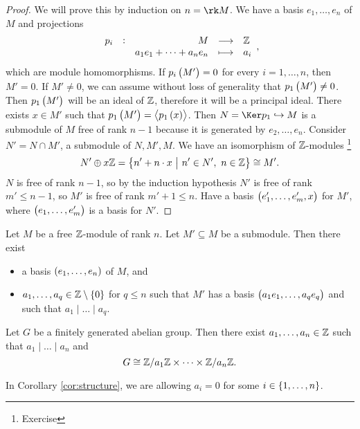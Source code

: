 \begin{proof}
We will prove this by induction on $ n = \rk M $. We have a basis $ e_1, \dots, e_n $ of $ M $ and projections
$$ \function[p_i]{M}{\ZZ}{a_1e_1 + \dots + a_ne_n}{a_i}, $$
which are module homomorphisms. If $ p_i\br{M'} = 0 $ for every $ i = 1, \dots, n $, then $ M' = 0 $. If $ M' \ne 0 $, we can assume without loss of generality that $ p_1\br{M'} \ne 0 $. Then $ p_1\br{M'} $ will be an ideal of $ \mathbb{Z} $, therefore it will be a principal ideal. There exists $ x \in M' $ such that $ p_1\br{M'} = \abr{p_1\br{x}} $. Then $ N = \Ker p_1 \hookrightarrow M $ is a submodule of $ M $ free of rank $ n - 1 $ because it is generated by $ e_2, \dots, e_n $. Consider $ N' = N \cap M' $, a submodule of $ N, M', M $. We have an isomorphism of $ \mathbb{Z} $-modules \footnote{Exercise}
$$ N' \oplus x\ZZ = \cbr{n' + n \cdot x \st n' \in N', \ n \in \ZZ} \cong M'. $$
$ N $ is free of rank $ n - 1 $, so by the induction hypothesis $ N' $ is free of rank $ m' \le n - 1 $, so $ M' $ is free of rank $ m' + 1 \le n $. Have a basis $ \br{e_1', \dots, e_m', x} $ for $ M' $, where $ \br{e_1, \dots, e_m'} $ is a basis for $ N' $.
\end{proof}

\begin{theorem}
\label{thm:structure}
Let $ M $ be a free $ \mathbb{Z} $-module of rank $ n $. Let $ M' \subseteq M $ be a submodule. Then there exist
\begin{itemize}
\item a basis $ \br{e_1, \dots, e_n} $ of $ M $, and
\item $ a_1, \dots, a_q \in \ZZ \setminus \cbr{0} $ for $ q \le n $ such that $ M' $ has a basis $ \br{a_1e_1, \dots, a_qe_q} $ and such that $ a_1 \mid \dots \mid a_q $.
\end{itemize}
\end{theorem}

\begin{corollary}
\label{cor:structure}
Let $ G $ be a finitely generated abelian group. Then there exist $ a_1, \dots, a_n \in \mathbb{Z} $ such that $ a_1 \mid \dots \mid a_n $ and
$$ G \cong \mathbb{Z} / a_1\mathbb{Z} \times \dots \times \mathbb{Z} / a_n\mathbb{Z}. $$
\end{corollary}


\begin{remark*}
In Corollary \ref{cor:structure}, we are allowing $ a_i = 0 $ for some $ i \in \cbr{1, \dots, n} $.
\end{remark*}

